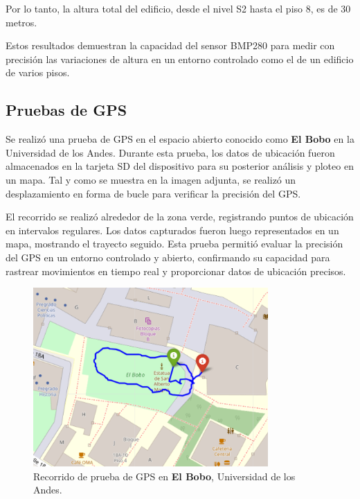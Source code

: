             Por lo tanto, la altura total del edificio, desde el nivel S2 hasta el piso 8, es de 30 metros.

            Estos resultados demuestran la capacidad del sensor BMP280 para medir con precisión las variaciones de altura en un entorno controlado como el de un edificio de varios pisos.



    \subsection{Pruebas de GPS}
        Se realizó una prueba de GPS en el espacio abierto conocido como \textbf{El Bobo} en la Universidad de los Andes. Durante esta prueba, los datos de ubicación fueron almacenados en la tarjeta SD del dispositivo para su posterior análisis y ploteo en un mapa. Tal y como se muestra en la imagen adjunta, se realizó un desplazamiento en forma de bucle para verificar la precisión del GPS.

        El recorrido se realizó alrededor de la zona verde, registrando puntos de ubicación en intervalos regulares. Los datos capturados fueron luego representados en un mapa, mostrando el trayecto seguido. Esta prueba permitió evaluar la precisión del GPS en un entorno controlado y abierto, confirmando su capacidad para rastrear movimientos en tiempo real y proporcionar datos de ubicación precisos.

        \begin{figure}[H]
        \centering
        \includegraphics[width=0.8\textwidth]{Imagenes/Pruebas/gps.png}
        \caption{Recorrido de prueba de GPS en \textbf{El Bobo}, Universidad de los Andes.}
        \label{fig
        }
        \end{figure}